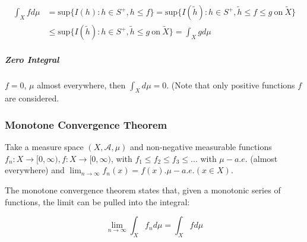 \begin{equation}
\begin{array}{rl}
\int_X f d\mu &= \mathrm{sup}\{ I(h): h\in S^+, h\leq f \} =  \mathrm{sup}\{ I(\tilde{h}): h\in S^+, \tilde{h}\leq f \leq g\mathrm{\ on\ }\tilde{X}\}\\
&\leq \mathrm{sup}\{ I(\tilde{h}): h\in S^+, \tilde{h}\leq g\mathrm{\ on\ }\tilde{X}\} = \int_X g d\mu
\end{array}
\end{equation}

\subparagraph{Zero Integral}
$f=0$, $\mu$ almost everywhere, then $\int_X d\mu = 0$. (Note that only positive functions $f$ are considered.




\subsubsection{Monotone Convergence Theorem}

Take a measure space $(X,\mathscr{A},\mu)$ and non-negative measurable functions $f_n: X \rightarrow [0,\infty), f: X \rightarrow [0,\infty)$, with $f_1 \leq f_2 \leq f_3 \leq ... $ with $\mu-a.e.$ (almost everywhere) and $\lim_{n\rightarrow \infty} f_n(x) = f(x). \mu-a.e. (x\in X)$.

The monotone convergence theorem states that, given a monotonic series of functions, the limit can be pulled into the integral:

\begin{equation}
\lim_{n\rightarrow \infty} \int_X f_n d\mu = \int_X f d\mu
\end{equation}


